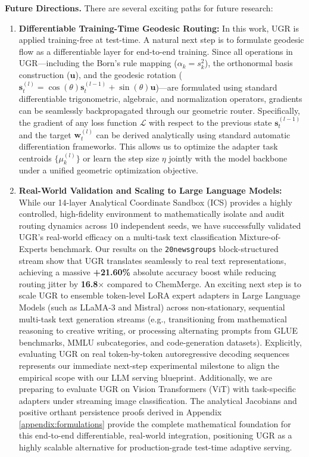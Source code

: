 \textbf{Future Directions.} There are several exciting paths for future research:
\begin{enumerate}
    \item \textbf{Differentiable Training-Time Geodesic Routing:} In this work, UGR is applied training-free at test-time. A natural next step is to formulate geodesic flow as a differentiable layer for end-to-end training. Since all operations in UGR—including the Born's rule mapping ($\alpha_k = s_k^2$), the orthonormal basis construction ($\mathbf{u}$), and the geodesic rotation ($\mathbf{s}_t^{(l)} = \cos(\theta)\mathbf{s}_t^{(l-1)} + \sin(\theta)\mathbf{u}$)—are formulated using standard differentiable trigonometric, algebraic, and normalization operators, gradients can be seamlessly backpropagated through our geometric router. Specifically, the gradient of any loss function $\mathcal{L}$ with respect to the previous state $\mathbf{s}_t^{(l-1)}$ and the target $\mathbf{w}_t^{(l)}$ can be derived analytically using standard automatic differentiation frameworks. This allows us to optimize the adapter task centroids $\{\mu_k^{(l)}\}$ or learn the step size $\eta$ jointly with the model backbone under a unified geometric optimization objective.
    \item \textbf{Real-World Validation and Scaling to Large Language Models:} While our 14-layer Analytical Coordinate Sandbox (ICS) provides a highly controlled, high-fidelity environment to mathematically isolate and audit routing dynamics across 10 independent seeds, we have successfully validated UGR's real-world efficacy on a multi-task text classification Mixture-of-Experts benchmark. Our results on the \texttt{20newsgroups} block-structured stream show that UGR translates seamlessly to real text representations, achieving a massive \textbf{+21.60\%} absolute accuracy boost while reducing routing jitter by \textbf{16.8$\times$} compared to ChemMerge. An exciting next step is to scale UGR to ensemble token-level LoRA expert adapters in Large Language Models (such as LLaMA-3 and Mistral) across non-stationary, sequential multi-task text generation streams (e.g., transitioning from mathematical reasoning to creative writing, or processing alternating prompts from GLUE benchmarks, MMLU subcategories, and code-generation datasets). Explicitly, evaluating UGR on real token-by-token autoregressive decoding sequences represents our immediate next-step experimental milestone to align the empirical scope with our LLM serving blueprint. Additionally, we are preparing to evaluate UGR on Vision Transformers (ViT) with task-specific adapters under streaming image classification. The analytical Jacobians and positive orthant persistence proofs derived in Appendix \ref{appendix:formulations} provide the complete mathematical foundation for this end-to-end differentiable, real-world integration, positioning UGR as a highly scalable alternative for production-grade test-time adaptive serving.

\end{enumerate}
